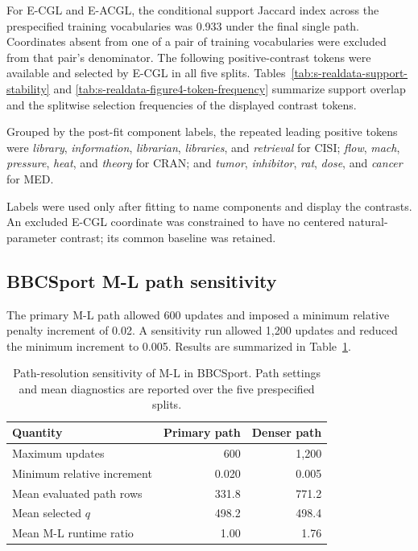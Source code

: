 \documentclass[preprint,12pt,authoryear]{elsarticle}
\begin{document}
For E-CGL and E-ACGL, the conditional support Jaccard index across the prespecified
training vocabularies was 0.933 under the final single path. Coordinates absent
from one of a pair of training vocabularies were excluded from that pair's
denominator. The following positive-contrast tokens were available and
selected by E-CGL in all five splits. Tables~\ref{tab:s-realdata-support-stability}
and \ref{tab:s-realdata-figure4-token-frequency} summarize support overlap and
the splitwise selection frequencies of the displayed contrast tokens.





Grouped by the post-fit component labels, the repeated leading positive tokens
were \emph{library}, \emph{information}, \emph{librarian}, \emph{libraries},
and \emph{retrieval} for CISI; \emph{flow}, \emph{mach}, \emph{pressure},
\emph{heat}, and \emph{theory} for CRAN; and \emph{tumor}, \emph{inhibitor},
\emph{rat}, \emph{dose}, and \emph{cancer} for MED.

Labels were used only after fitting to name components and display the
contrasts. An excluded E-CGL coordinate was constrained to have no centered
natural-parameter contrast; its common baseline was retained.

\clearpage
\subsection{BBCSport M-L path sensitivity}

The primary M-L path allowed 600 updates and imposed a minimum relative
penalty increment of 0.02. A sensitivity run allowed 1,200 updates and reduced
the minimum increment to 0.005. Results are summarized in
Table~\ref{tab:s-bbcsport-ml-path}.

\begin{table}[H]
\centering
\small
\caption{Path-resolution sensitivity of M-L in BBCSport. Path settings and
mean diagnostics are reported over the five prespecified splits.}
\label{tab:s-bbcsport-ml-path}
\begin{tabular}{lrr}
\toprule
Quantity & Primary path & Denser path \\
\midrule
Maximum updates & 600 & 1,200 \\
Minimum relative increment & 0.020 & 0.005 \\
Mean evaluated path rows & 331.8 & 771.2 \\
Mean selected $q$ & 498.2 & 498.4 \\
Mean M-L runtime ratio & 1.00 & 1.76 \\
\bottomrule
\end{tabular}
\end{table}
\end{document}
